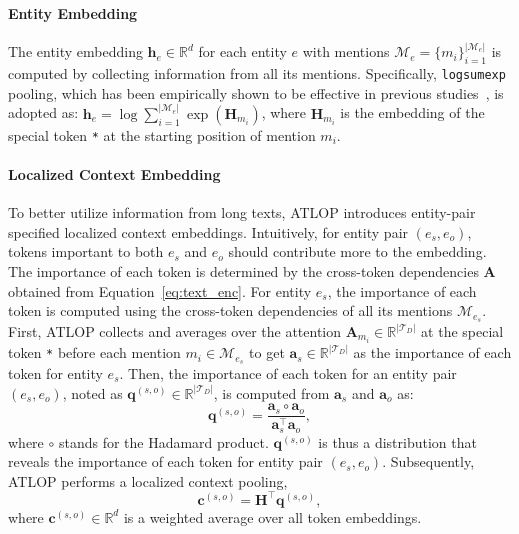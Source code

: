 \documentclass[11pt]{article}
\newcommand{\setM}{\mathcal{M}}
\newcommand{\setT}{\mathcal{T}}
\begin{document}
\paragraph{Entity Embedding}  The entity embedding $\bm{h}_{e} \in \mathbb{R}^d$ for each entity $e$ with mentions $\setM_{e}=\{m_i\}_{i=1}^{|\mathcal{M}_e|}$ is computed by collecting information from all its mentions. 
Specifically, \texttt{logsumexp} pooling, which has been empirically shown to be effective in previous studies~\cite{jia-etal-2019-document}, is adopted as: $\bm{h}_{e} = \log\sum_{i=1}^{|\setM_e|}\exp(\bm{H}_{m_i})$, where $\bm{H}_{m_i}$ is the embedding of the special token \texttt{*} at the starting position of mention $m_i$.

\paragraph{Localized Context Embedding} To better utilize information from long texts, ATLOP introduces entity-pair specified localized context embeddings. 
Intuitively, for entity pair $(e_s,e_o)$, tokens important to both $e_s$ and $e_o$ should contribute more to the embedding.
The importance of each token is determined by the cross-token dependencies $\bm{A}$ obtained from Equation~\ref{eq:text_enc}.
For entity $e_s$, the importance of each token is computed using the cross-token dependencies of all its mentions $\setM_{e_s}$. 
First, ATLOP collects and averages over the attention $\bm{A}_{m_i} \in \mathbb{R}^{|\setT_D|}$ at the special token \texttt{*} before each mention $m_i \in \setM_{e_s}$ to get $\bm{a}_s \in \mathbb{R}^{|\setT_D|}$ as the importance of each token for entity $e_s$.
Then, the importance of each token for an entity pair $(e_s,e_o)$, noted as $\bm{q}^{(s,o)} \in \mathbb{R}^{|\setT_D|}$, is computed from $\bm{a}_s$ and $\bm{a}_o$ as: 
\begin{equation}
\bm{q}^{(s,o)} = \frac{\bm{a}_s \circ \bm{a}_o}{\bm{a}_s^\top \bm{a}_o}, \label{eq:context_emb_weight} 
\end{equation}
where $\circ$ stands for the Hadamard product.
$\bm{q}^{(s,o)}$ is thus a distribution that reveals the importance of each token for entity pair $(e_s, e_o)$.
Subsequently, ATLOP performs a localized context pooling,
\begin{equation}
\bm{c}^{(s,o)} = \bm{H}^\top \bm{q}^{(s,o)},\label{eq:context_rep}
\end{equation}   
where $\bm{c}^{(s,o)}\in \mathbb{R}^d$ is a weighted average over all token embeddings. 
\end{document}
